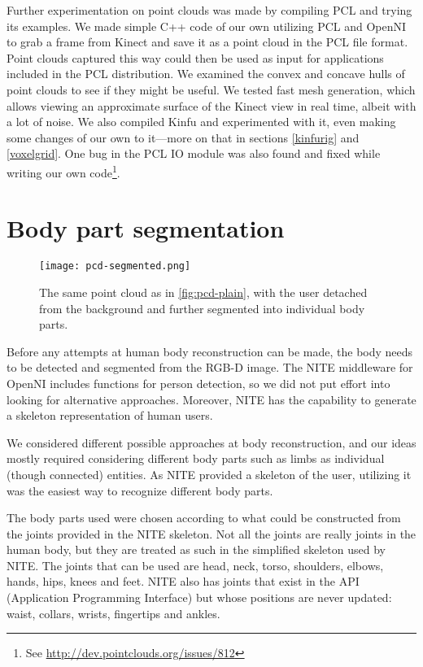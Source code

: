 Further experimentation on point clouds was made by compiling PCL and trying its examples. We made simple C++ code of our own utilizing PCL and OpenNI to grab a frame from Kinect and save it as a point cloud in the PCL file format. Point clouds captured this way could then be used as input for applications included in the PCL distribution. We examined the convex and concave hulls of point clouds to see if they might be useful. We tested fast mesh generation, which allows viewing an approximate surface of the Kinect view in real time, albeit with a lot of noise. We also compiled Kinfu and experimented with it, even making some changes of our own to it---more on that in sections \ref{kinfurig} and \ref{voxelgrid}. One bug in the PCL IO module was also found and fixed while writing our own code\footnote{See \url{http://dev.pointclouds.org/issues/812}}.


\section{Body part segmentation}

\begin{figure}
    \centering
    \texttt{[image: pcd-segmented.png]}
    \caption{The same point cloud as in \ref{fig:pcd-plain}, with the user detached from the background and further segmented into individual body parts.}
    \label{fig:pcd-segmented}
\end{figure}

Before any attempts at human body reconstruction can be made, the body needs to be detected and segmented from the RGB-D image. The NITE middleware for OpenNI \citep{NITE} includes functions for person detection, so we did not put effort into looking for alternative approaches. Moreover, NITE has the capability to generate a skeleton representation of human users.

We considered different possible approaches at body reconstruction, and our ideas mostly required considering different body parts such as limbs as individual (though connected) entities. As NITE provided a skeleton of the user, utilizing it was the easiest way to recognize different body parts.

The body parts used were chosen according to what could be constructed from the joints provided in the NITE skeleton. Not all the joints are really joints in the human body, but they are treated as such in the simplified skeleton used by NITE. The joints that can be used are head, neck, torso, shoulders, elbows, hands, hips, knees and feet. NITE also has joints that exist in the API (Application Programming Interface) but whose positions are never updated: waist, collars, wrists, fingertips and ankles. 

